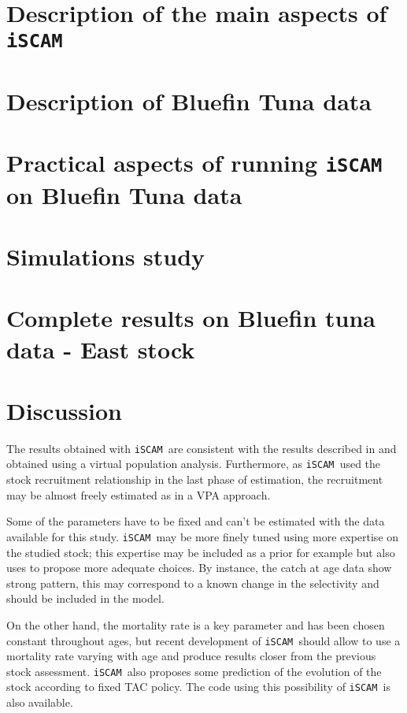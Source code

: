 \documentclass[ 12pt]{article}\usepackage{graphicx, color}
\newcommand{\iscam}{\texttt{iSCAM }}
\begin{document}
\section{Description of the main aspects of \iscam }


\clearpage\clearpage

\section{Description of Bluefin Tuna data}


\clearpage
\section{Practical aspects of running \iscam on Bluefin Tuna data}


\clearpage
\section{Simulations study}
\label{sec:simulation}


\section{Complete results on Bluefin tuna data - East stock}
\label{sec:results}


\section{Discussion}
\label{sec:concl}

The results obtained with \iscam are consistent with the results described in \cite{tuna2012} and obtained using a virtual population analysis. Furthermore, as \iscam used the stock recruitment relationship in the last phase of estimation, the recruitment may be almost freely estimated as in a VPA approach. 

Some of the parameters have to be fixed and can't be estimated with the data available for this study.
\iscam may be more finely tuned using more expertise on the studied stock; this expertise may be included as a prior for example but also uses to propose more adequate choices. By instance, the catch at age data show strong pattern, this may correspond to a known change in the selectivity and should be included in the model.

On the other hand, the mortality rate is a key parameter and has been chosen constant throughout ages, but recent development of \iscam should allow to use a mortality rate varying with age and produce results closer from the previous stock assessment.
\iscam also proposes some prediction of the evolution of the stock according to fixed TAC policy. The code using this possibility of \iscam is also available.
\end{document}
